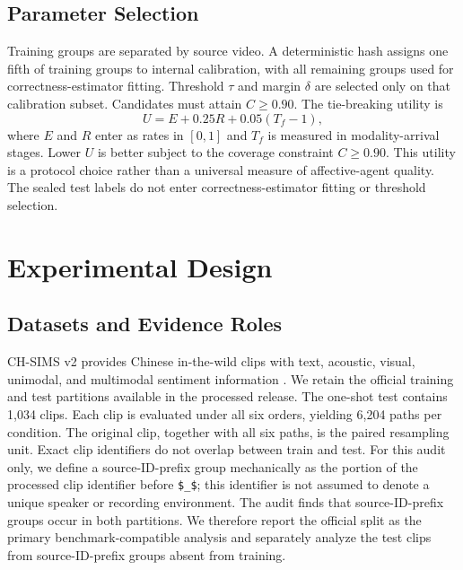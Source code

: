 \documentclass[journal]{IEEEtran}
\begin{document}
\subsection{Parameter Selection}

Training groups are separated by source video. A deterministic hash assigns one fifth of training groups to internal calibration, with all remaining groups used for correctness-estimator fitting. Threshold $\tau$ and margin $\delta$ are selected only on that calibration subset. Candidates must attain $C\geq0.90$. The tie-breaking utility is
\begin{equation}
U=E+0.25R+0.05(T_f-1),
\end{equation}
where $E$ and $R$ enter as rates in $[0,1]$ and $T_f$ is measured in modality-arrival stages. Lower $U$ is better subject to the coverage constraint $C\geq0.90$. This utility is a protocol choice rather than a universal measure of affective-agent quality. The sealed test labels do not enter correctness-estimator fitting or threshold selection.

\section{Experimental Design}

\subsection{Datasets and Evidence Roles}

CH-SIMS v2 provides Chinese in-the-wild clips with text, acoustic, visual, unimodal, and multimodal sentiment information \cite{liu2022chsimsv2}. We retain the official training and test partitions available in the processed release. The one-shot test contains 1,034 clips. Each clip is evaluated under all six orders, yielding 6,204 paths per condition. The original clip, together with all six paths, is the paired resampling unit. Exact clip identifiers do not overlap between train and test. For this audit only, we define a source-ID-prefix group mechanically as the portion of the processed clip identifier before \texttt{\$\_\$}; this identifier is not assumed to denote a unique speaker or recording environment. The audit finds that \OverlappingSourceGroups{} source-ID-prefix groups occur in both partitions. We therefore report the official split as the primary benchmark-compatible analysis and separately analyze the \SourceDisjointClips{} test clips from \SourceDisjointGroups{} source-ID-prefix groups absent from training.
\end{document}
